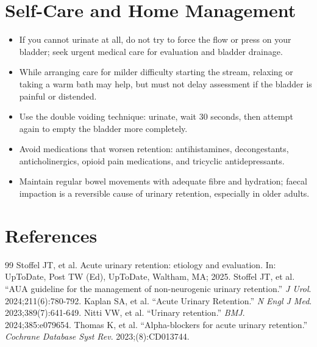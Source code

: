 \section*{Self-Care and Home Management}
\begin{itemize}
  \item If you cannot urinate at all, do not try to force the flow or press on your bladder; seek urgent medical care for evaluation and bladder drainage.
  \item While arranging care for milder difficulty starting the stream, relaxing or taking a warm bath may help, but must not delay assessment if the bladder is painful or distended.
  \item Use the double voiding technique: urinate, wait 30 seconds, then attempt again to empty the bladder more completely.
  \item Avoid medications that worsen retention: antihistamines, decongestants, anticholinergics, opioid pain medications, and tricyclic antidepressants.
  \item Maintain regular bowel movements with adequate fibre and hydration; faecal impaction is a reversible cause of urinary retention, especially in older adults.
\end{itemize}

\section*{References}
\begin{thebibliography}{99}
 Stoffel JT, et al. Acute urinary retention: etiology and evaluation. In: UpToDate, Post TW (Ed), UpToDate, Waltham, MA; 2025.
 Stoffel JT, et al. ``AUA guideline for the management of non-neurogenic urinary retention.'' \emph{J Urol}. 2024;211(6):780-792.
 Kaplan SA, et al. ``Acute Urinary Retention.'' \emph{N Engl J Med}. 2023;389(7):641-649.
 Nitti VW, et al. ``Urinary retention.'' \emph{BMJ}. 2024;385:e079654.
 Thomas K, et al. ``Alpha-blockers for acute urinary retention.'' \emph{Cochrane Database Syst Rev}. 2023;(8):CD013744.
\end{thebibliography}

